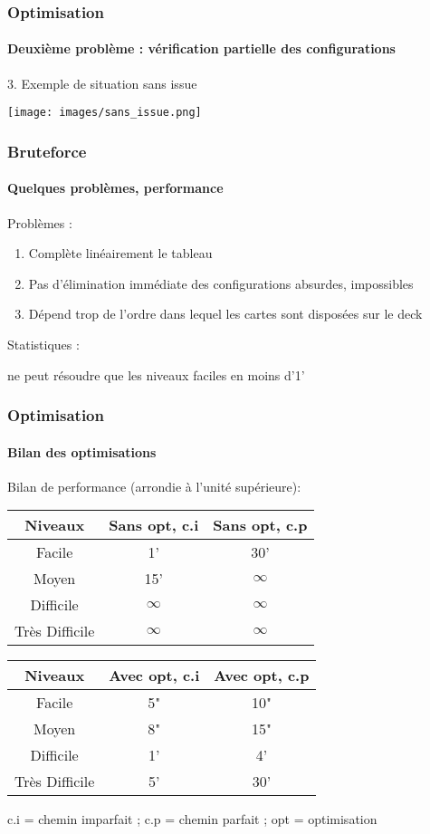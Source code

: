 \documentclass{beamer}
\begin{document}
\begin{frame}
	\frametitle{Optimisation}
	\framesubtitle{Deuxième problème : vérification partielle des configurations}
	3. Exemple de situation sans issue 
	\begin{center}
		\texttt{[image: images/sans\_issue.png]}
	\end{center}
	
	
\end{frame}
\begin{frame}
	\frametitle{Bruteforce}
	\framesubtitle{Quelques problèmes, performance}
	

	Problèmes : 
	\begin{enumerate}
		\item Complète linéairement le tableau 
		\item Pas d'élimination immédiate des configurations absurdes, impossibles
		\item Dépend trop de l'ordre dans lequel les cartes sont disposées sur le deck 
	\end{enumerate}
	
	Statistiques : 
	\begin{center}
		ne peut résoudre que les niveaux faciles en moins d'1'
	\end{center}
	
\end{frame}
\begin{frame}
	\frametitle{Optimisation}
	\framesubtitle{Bilan des optimisations}
	Bilan de performance (arrondie à l'unité supérieure): 
	\begin{center}
		\begin{tabular}{|c||c|c|}
			\hline
			Niveaux & Sans opt, c.i& Sans opt, c.p \\ \hline
			Facile &  1' &  30' \\ \hline
			Moyen & 15' & $\infty$  \\ \hline
			Difficile & $\infty$ & $\infty$  \\ \hline
			Très Difficile & $\infty$ & $\infty$ \\ \hline
		\end{tabular}
	\end{center}
	\begin{center}
		\begin{tabular}{|c||c|c|}
			\hline
			Niveaux &  Avec opt, c.i & Avec opt, c.p \\ \hline 
			Facile &  5" & 10" \\ \hline
			Moyen &  8" & 15" \\ \hline
			Difficile &  1' & 4' \\ \hline
			Très Difficile &  5' & 30'  \\ \hline
		\end{tabular}

	\end{center}
	\footnotesize c.i = chemin imparfait ; c.p = chemin parfait ; opt = optimisation 
\end{frame}
\end{document}
